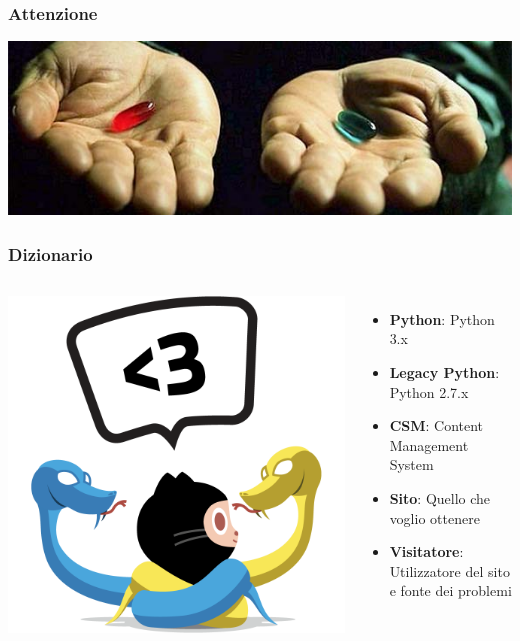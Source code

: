 \begin{frame}
	\frametitle{Attenzione}
	\begin{center}
		\includegraphics[scale=0.5]{img/pillole}
	\end{center}

\end{frame}


\begin{frame}
	\frametitle{Dizionario}
	\begin{columns}
		\begin{center}
			\includegraphics[scale=0.15]{img/octocats/pythocat.png}
		\end{center}
		\begin{itemize}
			\item \textbf{Python}: Python 3.x
			\item \textbf{Legacy Python}: Python 2.7.x
			\item \textbf{CSM}: Content Management System
			\item \textbf{Sito}: Quello che voglio ottenere
			\item \textbf{Visitatore}: Utilizzatore del sito e fonte dei problemi
		\end{itemize}
	\end{columns}
\end{frame}

